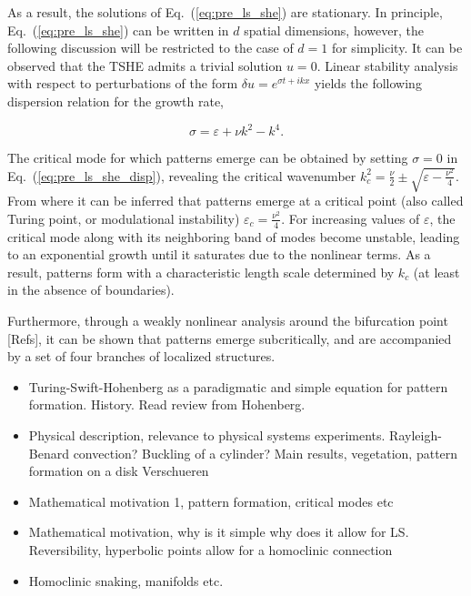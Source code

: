 As a result, the solutions of Eq.~(\ref{eq:pre_ls_she}) are stationary.
In principle, Eq.~(\ref{eq:pre_ls_she}) can be written in 
$d$ spatial dimensions, however, the following discussion will be restricted to the case of $d=1$ for simplicity.
It can be observed that the TSHE admits a trivial solution $u=0$. Linear
stability analysis with respect to perturbations of the form $\delta u = e^{\sigma t + ikx}$ yields
the following dispersion relation for the growth rate,

\begin{equation}
    \sigma = \varepsilon + \nu k^2 - k^4.
    \label{eq:pre_ls_she_disp}
\end{equation}

The critical mode for which patterns emerge can be obtained by setting $\sigma = 0$ in Eq.~(\ref{eq:pre_ls_she_disp}),
revealing the critical wavenumber $k_c^2 = \frac{\nu}{2} \pm \sqrt{\varepsilon - \frac{\nu^2}{4}}$. From where
it can be inferred that patterns emerge at a critical point (also called Turing point, or modulational instability) 
$\varepsilon_c = \frac{\nu^2}{4}$. For increasing values of $\varepsilon$,
the critical mode along with its neighboring band of modes become unstable, leading to an exponential growth
until it saturates due to the nonlinear terms. As a result, patterns form with a characteristic length scale determined
by $k_c$ (at least in the absence of boundaries).

Furthermore, through a weakly nonlinear analysis around the bifurcation point [Refs], it can be shown
that patterns emerge subcritically, and are accompanied by a set of four branches of localized structures.


\begin{itemize}
    \item Turing-Swift-Hohenberg as a paradigmatic and simple equation for pattern
formation. History. Read review from Hohenberg.
    \item Physical description, relevance to physical systems experiments. 
    Rayleigh-Benard convection? Buckling of a cylinder? Main results, vegetation,
    pattern formation on a disk Verschueren
    \item Mathematical motivation 1, pattern formation, critical modes etc
    \item Mathematical motivation, why is it simple why does it allow for LS.
Reversibility, hyperbolic points allow for a homoclinic connection
    \item Homoclinic snaking, manifolds etc.
\end{itemize}

